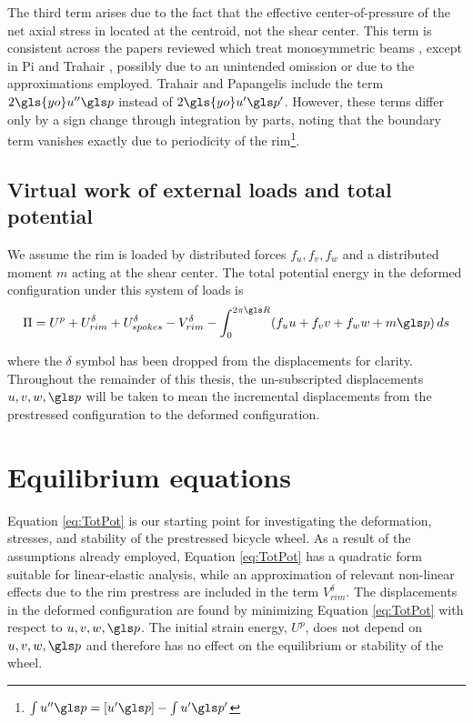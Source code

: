 \documentclass[\rootdir/thesis.tex]{subfiles}
\begin{document}
The third term arises due to the fact that the effective center-of-pressure of the net axial stress in located at the centroid, not the shear center. This term is consistent across the papers reviewed which treat monosymmetric beams \cite{Pi1995,Pi1992,Ryu2012,Trahair1987}, except in Pi and Trahair \cite{Pi1992}, possibly due to an unintended omission or due to the approximations employed. Trahair and Papangelis include the term $2\gls{yo}u''\p$ instead of $2\gls{yo}u'\p'$. However, these terms differ only by a sign change through integration by parts, noting that the boundary term vanishes exactly due to periodicity of the rim\footnote{$\int u''\p = [u'\p] - \int u'\p'$}.


\subsection{Virtual work of external loads and total potential}

We assume the rim is loaded by distributed forces $f_u,f_v,f_w$ and a distributed moment $m$ acting at the shear center. The total potential energy in the deformed configuration under this system of loads is
\begin{equation}
\label{eq:TotPot}
\Pi = U^p + U_{rim}^{\delta} + U_{spokes}^{\delta} - V_{rim}^{\delta} - \int_0^{2\pi \R} (f_uu+f_vv+f_ww+m\p)\, ds
\end{equation}

where the $\delta$ symbol has been dropped from the displacements for clarity. Throughout the remainder of this thesis, the un-subscripted displacements $u,v,w,\p$ will be taken to mean the incremental displacements from the prestressed configuration to the deformed configuration.

\section{Equilibrium equations}

Equation \eqref{eq:TotPot} is our starting point for investigating the deformation, stresses, and stability of the prestressed bicycle wheel. As a result of the assumptions already employed, Equation \eqref{eq:TotPot} has a quadratic form suitable for linear-elastic analysis, while an approximation of relevant non-linear effects due to the rim prestress are included in the term $V_{rim}^{\delta}$. The displacements in the deformed configuration are found by minimizing Equation \eqref{eq:TotPot} with respect to $u,v,w,\p$. The initial strain energy, $U^p$, does not depend on $u,v,w,\p$ and therefore has no effect on the equilibrium or stability of the wheel.
\end{document}
